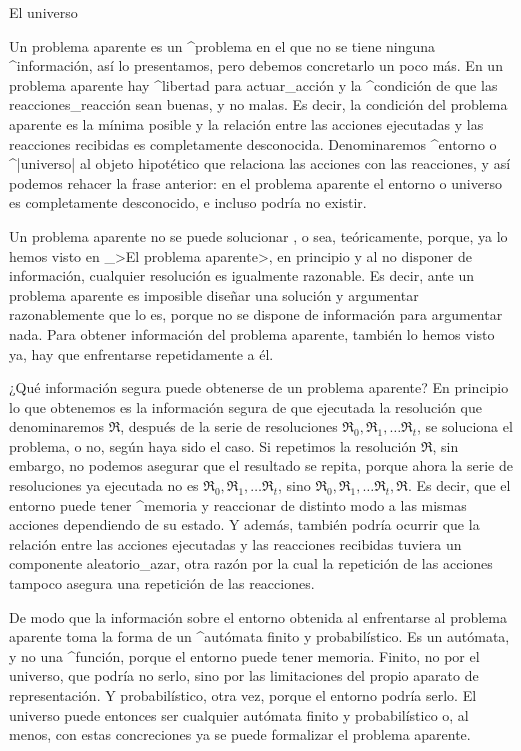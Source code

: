 \kern-12pt

\Section El universo

Un problema aparente es un ^{problema} en el que no se tiene ninguna
^{información}, así lo presentamos, pero debemos concretarlo un poco
más. En un problema aparente hay ^{libertad} para actuar_{acción} y la
^{condición} de que las reacciones_{reacción} sean buenas, y no malas.
Es decir, la condición del problema aparente es la mínima posible y la
relación entre las acciones ejecutadas y las reacciones recibidas es
completamente desconocida. Denominaremos ^{entorno} o ^|universo| al
objeto hipotético que relaciona las acciones con las reacciones, y así
podemos rehacer la frase anterior: en el problema aparente el entorno o
universo es completamente desconocido, e incluso podría no existir.

Un problema aparente no se puede solucionar , o sea,
teóricamente, porque, ya lo hemos visto en _>El problema aparente>, en
principio y al no disponer de información, cualquier resolución es
igualmente razonable. Es decir, ante un problema aparente es imposible
diseñar una solución y argumentar razonablemente que lo es, porque no se
dispone de información para argumentar nada. Para obtener información
del problema aparente, también lo hemos visto ya, hay que enfrentarse
repetidamente a él.

¿Qué información segura puede obtenerse de un problema aparente? En
principio lo que obtenemos es la información segura de que ejecutada la
resolución que denominaremos $\Re$, después de la serie de resoluciones
$\Re_0, \Re_1, \ldots \Re_t$, se soluciona el problema, o no, según haya
sido el caso. Si repetimos la resolución $\Re$, sin embargo, no podemos
asegurar que el resultado se repita, porque ahora la serie de
resoluciones ya ejecutada no es $\Re_0, \Re_1, \ldots \Re_t$, sino
$\Re_0, \Re_1, \ldots \Re_t, \Re$. Es decir, que el entorno puede tener
^{memoria} y reaccionar de distinto modo a las mismas acciones
dependiendo de su estado. Y además, también podría ocurrir que la
relación entre las acciones ejecutadas y las reacciones recibidas
tuviera un componente aleatorio_{azar}, otra razón por la cual la
repetición de las acciones tampoco asegura una repetición de las
reacciones.

De modo que la información sobre el entorno obtenida al enfrentarse al
problema aparente toma la forma de un ^{autómata} finito y
probabilístico. Es un autómata, y no una ^{función}, porque el
\hbox{entorno} puede tener memoria. Finito, no por el universo, que
podría no serlo, sino por las limitaciones del propio aparato de
representación. Y probabilístico, otra vez, porque el entorno podría
serlo. El universo puede entonces ser cualquier autómata finito y
probabilístico o, al menos, con estas concreciones ya se puede
formalizar el problema aparente.

